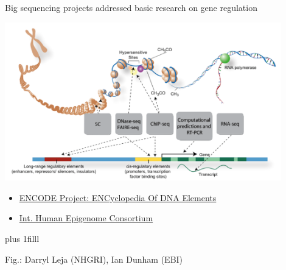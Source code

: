 \documentclass[10pt]{beamer}
\newcommand{\credit}[1]{{\vskip0pt plus 1filll \par \raggedleft \scriptsize \mdseries \color{mDarkBrown} #1 \par}}
\begin{document}
\begin{frame}{Big sequencing projects addressed basic research on gene regulation}
	\begin{center}
		\includegraphics[width=0.9\textwidth]{./figures/EncodeNatureGraphic.png}
	\end{center}
    \begin{itemize}
    	\item \href{https://www.encodeproject.org}{ENCODE Project: ENCyclopedia Of DNA Elements}
    	\item \href{http://www.cell.com/consortium/IHEC}{Int. Human Epigenome Consortium}
    \end{itemize}
	\credit{Fig.: Darryl Leja (NHGRI), Ian Dunham (EBI)}
\end{frame}
\end{document}
